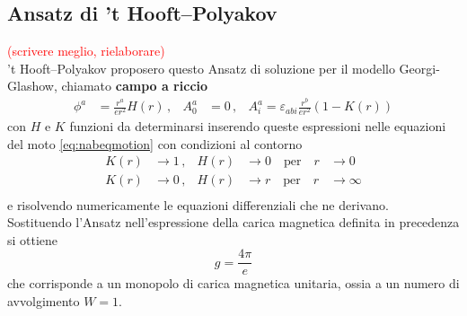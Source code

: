 \subsection{Ansatz di ’t Hooft–Polyakov}
\textcolor{red}{(scrivere meglio, rielaborare)}\\
’t Hooft–Polyakov proposero questo Ansatz di soluzione per il modello Georgi-Glashow,
chiamato \textbf{campo a riccio}
\begin{equation}
   \begin{aligned}
      \phi^a & = \frac{r^a}{er^2}H(r) \, ,&
      A_0^a & = 0 \, ,&
      A_i^a = \varepsilon_{abi}\frac{r^b}{er^2}(1-K(r))
   \end{aligned}
\end{equation}
con $H$ e $K$ funzioni da determinarsi inserendo queste espressioni nelle equazioni
del moto \ref{eq:nabeqmotion} con condizioni al contorno
\begin{equation}
   \begin{aligned}
      K(r) &\to 1 \, ,& H(r) &\to 0 \quad \mathrm{per} \quad r & \to 0 \\
      K(r) &\to 0 \, ,& H(r) &\to r \quad \mathrm{per} \quad r & \to \infty \\
   \end{aligned}
\end{equation}
e risolvendo numericamente le equazioni differenziali che ne derivano.\\

Sostituendo l'Ansatz nell'espressione della carica magnetica definita in precedenza
si ottiene
\begin{equation}
   g = \frac{4\pi}{e}
\end{equation}
che corrisponde a un monopolo di carica magnetica unitaria, ossia a un
numero di avvolgimento $W = 1$.\\
